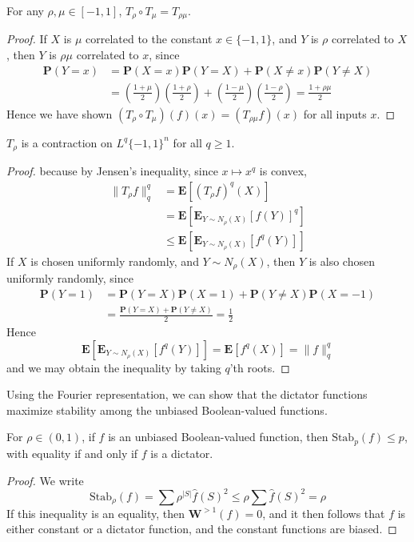 \begin{theorem}
    For any $\rho, \mu \in [-1,1]$, $T_\rho \circ T_\mu = T_{\rho \mu}$.
\end{theorem}
\begin{proof}
    If $X$ is $\mu$ correlated to the constant $x \in \{ -1, 1 \}$, and $Y$ is $\rho$ correlated to $X$, then $Y$ is $\rho \mu$ correlated to $x$, since
    \begin{align*}
        \mathbf{P}(Y = x) &= \mathbf{P}(X = x) \mathbf{P}(Y = X) + \mathbf{P}(X \neq x) \mathbf{P}(Y \neq X)\\
        &= \left( \frac{1 + \mu}{2} \right) \left( \frac{1 + \rho}{2} \right) + \left( \frac{1 - \mu}{2} \right) \left( \frac{1 - \rho}{2} \right) = \frac{1 + \rho \mu}{2}
    \end{align*}
    Hence we have shown $(T_\rho \circ T_\mu)(f)(x) = (T_{\rho \mu} f)(x)$ for all inputs $x$.
\end{proof}

\begin{theorem}
    $T_\rho$ is a contraction on $L^q \{ -1,1 \}^n$ for all $q \geq 1$.
\end{theorem}
\begin{proof}
because by Jensen's inequality, since $x \mapsto x^q$ is convex,
%
\begin{align*}
    \| T_\rho f \|^q_q &= \mathbf{E}[(T_\rho f)^q(X)]\\
    &= \mathbf{E}[\mathbf{E}_{Y \sim N_\rho(X)}[f(Y)]^q]\\
    &\leq \mathbf{E}[\mathbf{E}_{Y \sim N_\rho(X)}[f^q(Y)]]
\end{align*}
%
If $X$ is chosen uniformly randomly, and $Y \sim N_\rho(X)$, then $Y$ is also chosen uniformly randomly, since
%
\begin{align*}
    \mathbf{P}(Y = 1) &= \mathbf{P}(Y = X) \mathbf{P}(X = 1) + \mathbf{P}(Y \neq X) \mathbf{P}(X = -1)\\
    &= \frac{\mathbf{P}(Y = X) + \mathbf{P}(Y \neq X)}{2} = \frac{1}{2}
\end{align*}
%
Hence
%
\[ \mathbf{E}[\mathbf{E}_{Y \sim N_\rho(X)}[f^q(Y)]] = \mathbf{E}[f^q(X)] = \| f \|_q^q \]
%
and we may obtain the inequality by taking $q$'th roots.
\end{proof}

Using the Fourier representation, we can show that the dictator functions maximize stability among the unbiased Boolean-valued functions.

\begin{theorem}
    For $\rho \in (0,1)$, if $f$ is an unbiased Boolean-valued function, then $\text{Stab}_p(f) \leq p$, with equality if and only if $f$ is a dictator.
\end{theorem}
\begin{proof}
    We write
    \[ \text{Stab}_\rho(f) = \sum \rho^{|S|} \widehat{f}(S)^2 \leq \rho \sum \widehat{f}(S)^2 = \rho \]
    If this inequality is an equality, then $\mathbf{W}^{> 1}(f) = 0$, and it then follows that $f$ is either constant or a dictator function, and the constant functions are biased.
\end{proof}

